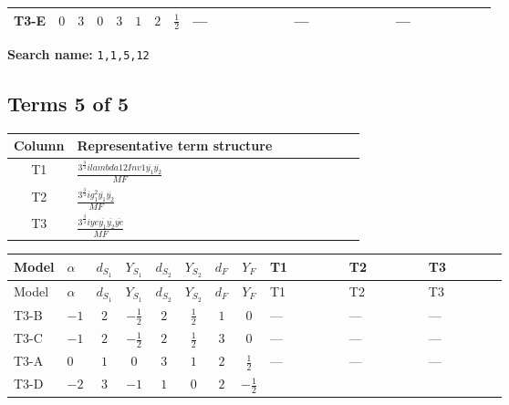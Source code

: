 \documentclass[8pt]{article}
\begin{document}
\begin{landscape}
\begin{longtable}{@{}llcccccc >{\raggedright\arraybackslash}p{0.21\linewidth} >{\raggedright\arraybackslash}p{0.21\linewidth} >{\raggedright\arraybackslash}p{0.21\linewidth}@{}}
\midrule
T3-E & $0$ & $3$ & $0$ & $3$ & $1$ & $2$ & $\frac{1}{2}$ & --- & --- & --- \\
\midrule
\bottomrule
\end{longtable}
\clearpage
\noindent\textbf{Search name: }\texttt{1,1,5,12}\par\smallskip
\subsection*{Terms 5 of 5}
\begin{center}
\begin{tabular}{@{}c >{\raggedright\arraybackslash}p{0.82\linewidth}@{}}
\toprule
Column & Representative term structure \\
\midrule
T1 & \(\displaystyle \frac{3^{\frac{3}{4}} i lambda12Inv1 \overline{y_{1}} \overline{y_{2}}}{MF}\) \\
\midrule
T2 & \(\displaystyle \frac{3^{\frac{3}{4}} i g_{1}^{2} \overline{y_{1}} \overline{y_{2}}}{MF}\) \\
\midrule
T3 & \(\displaystyle \frac{3^{\frac{3}{4}} i ye \overline{y_{1}} \overline{y_{2}} \overline{ye}}{MF}\) \\
\midrule
\bottomrule
\end{tabular}
\end{center}
\smallskip
\tiny
\begin{longtable}{@{}llcccccc >{\raggedright\arraybackslash}p{0.21\linewidth} >{\raggedright\arraybackslash}p{0.21\linewidth} >{\raggedright\arraybackslash}p{0.21\linewidth}@{}}
\toprule
Model & $\alpha$ & $d_{S_1}$ & $Y_{S_1}$ & $d_{S_2}$ & $Y_{S_2}$ & $d_F$ & $Y_F$ & T1 & T2 & T3 \\
\midrule
\endfirsthead
\toprule
Model & $\alpha$ & $d_{S_1}$ & $Y_{S_1}$ & $d_{S_2}$ & $Y_{S_2}$ & $d_F$ & $Y_F$ & T1 & T2 & T3 \\
\midrule
\endhead
T3-B & $-1$ & $2$ & $-\frac{1}{2}$ & $2$ & $\frac{1}{2}$ & $1$ & $0$ & --- & --- & --- \\
\midrule
T3-C & $-1$ & $2$ & $-\frac{1}{2}$ & $2$ & $\frac{1}{2}$ & $3$ & $0$ & --- & --- & --- \\
\midrule
T3-A & $0$ & $1$ & $0$ & $3$ & $1$ & $2$ & $\frac{1}{2}$ & --- & --- & --- \\
\midrule
T3-D & $-2$ & $3$ & $-1$ & $1$ & $0$ & $2$ & $-\frac{1}{2}$ & \scriptsize\adjustbox{max width=\linewidth}{$\begin{gathered} - \frac{3^{\frac{3}{4}} i lambda12Inv1 \overline{y_{1}} \overline{y_{2}}}{6 MF}\end{gathered}$} & \scriptsize\adjustbox{max width=\linewidth}{$\begin{gathered} - \frac{3^{\frac{3}{4}} i g_{1}^{2} \overline{y_{1}} \overline{y_{2}}}{8 MF}\end{gathered}$} & \scriptsize\adjustbox{max width=\linewidth}{$\begin{gathered} \frac{3^{\frac{3}{4}} i ye \overline{y_{1}} \overline{y_{2}} \overline{ye}}{12 MF}\end{gathered}$} \\

\end{longtable}
\end{landscape}
\end{document}
